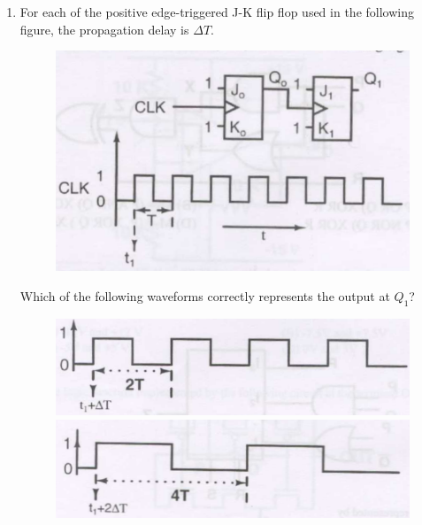 \documentclass[a4paper, 11pt]{article}
\begin{document}
\begin{enumerate}
    \hfill{}
    
    \item For each of the positive edge-triggered J-K flip flop used in the following figure, the propagation delay is $\Delta T$.
    \begin{figure}[H]
        \centering
        \includegraphics[width=0.8\columnwidth]{figs/q59.png}
        \caption*{}
        \label{fig:q59}
    \end{figure}
    Which of the following waveforms correctly represents the output at $Q_1$?
    \begin{figure}[H]
        \centering
        \begin{minipage}{0.45\textwidth}
            \centering
            \includegraphics[width=0.9\columnwidth]{figs/q59A.png}
            \centerline{}
        \end{minipage}
        \hfill
        \begin{minipage}{0.45\textwidth}
            \centering
            \includegraphics[width=0.9\columnwidth]{figs/q59B.png}
            \centerline{}
        \end{minipage}
        \vfill
        \begin{minipage}{0.45\textwidth}

\end{minipage}
\end{figure}
\end{enumerate}
\end{document}
